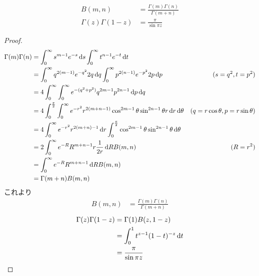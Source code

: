 \documentclass[uplatex,diffipdfmx,a4paper,11pt]{jlreq}
\begin{document}
\begin{proposition}[ガンマ関数とベータ関数との関係]
  \begin{align}
    B(m, n)                & = \frac{\Gamma(m)\Gamma(n)}{\Gamma(m + n)} \\
    \Gamma(z)\Gamma(1 - z) & = \frac{\pi}{\sin\pi z}
  \end{align}
\end{proposition}
\begin{proof}
  \begin{align}
    \Gamma(m)\Gamma(n) & = \int_0^\infty s^{m-1}e^{-s}\dl{s}\int_0^\infty t^{n-1}e^{-t}\dl{t}                                                                                      \\
                       & = \int_0^\infty q^{2(m-1)}e^{-q^2}2q\dl{q}\int_0^\infty p^{2(n-1)}e^{-p^2}2p\dl{p}                                   & (s = q^2, t = p^2)                 \\
                       & = 4\int_0^\infty \int_0^\infty e^{-(q^2 + p^2)}q^{2m-1}p^{2n-1}\dl{p}\dl{q}                                                                               \\
                       & = 4\int_0^{\frac{\pi}{2}}\int_0^\infty e^{-r^2}r^{2(m + n - 1)}\cos^{2m-1}\theta\sin^{2n-1}\theta r\dl{r}\dl{\theta} & (q = r\cos\theta, p = r\sin\theta) \\
                       & = 4\int_0^\infty e^{-r^2}r^{2(m + n) - 1}\dl{r}\int_0^{\frac{\pi}{2}}\cos^{2m-1}\theta\sin^{2n-1}\theta\dl{\theta}                                        \\
                       & = 2\int_0^\infty e^{-R}R^{m + n - 1}r\frac{1}{2r}\dl{R}B(m, n)                                                       & (R = r^2)                          \\
                       & = \int_0^\infty e^{-R}R^{m + n - 1}\dl{R}B(m, n)                                                                                                          \\
                       & = \Gamma(m + n)B(m, n)
  \end{align}
  これより
  \begin{align}
    B(m, n) & = \frac{\Gamma(m)\Gamma(n)}{\Gamma(m + n)}
  \end{align}
  \begin{align}
    \Gamma(z)\Gamma(1 - z) & = \Gamma(1)B(z, 1 - z)                \\
                           & = \int_{0}^{1}t^{z-1}(1-t)^{-z}\dl{t} \\
                           & = \frac{\pi}{\sin\pi z}
  \end{align}
\end{proof}
\end{document}
